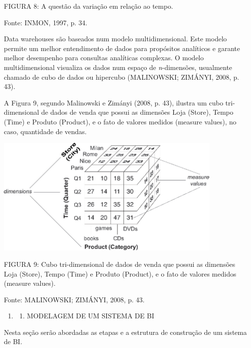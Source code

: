 \documentclass[a4paper]{article}
\newcommand\liststyleWWviiiNumi{%
\renewcommand\theenumi{\arabic{enumi}}
\renewcommand\theenumii{\arabic{enumi}.\arabic{enumii}}
\renewcommand\theenumiii{\arabic{enumi}.\arabic{enumii}.\arabic{enumiii}}
\renewcommand\theenumiv{\arabic{enumi}.\arabic{enumii}.\arabic{enumiii}.\arabic{enumiv}}
\renewcommand\labelenumi{\theenumi}
\renewcommand\labelenumii{\theenumii}
\renewcommand\labelenumiii{\theenumiii}
\renewcommand\labelenumiv{\theenumiv.}
}
\begin{document}
{
\textsf{\MakeUppercase{FIGURA }}\textsf{8: A quest\~ao da varia\c{c}\~ao em rela\c{c}\~ao ao tempo. }}

{
\textsf{Fonte: INMON, 1997, p. 34. \ }}

{
\textsf{Data warehouses s\~ao baseados num modelo multidimensional. Este modelo permite um melhor entendimento de dados
para prop\'ositos anal\'iticos e garante melhor desempenho para consultas anal\'iticas complexas. O modelo
multidimensional visualiza os dados num espa\c{c}o de }\textsf{\textit{n}}\textsf{{}-dimens\~oes, usualmente chamado de
cubo de dados ou hipercubo (MALINOWSKI; ZIM\'ANYI, 2008, p. 43).}}

{
\textsf{A Figura 9, segundo Malinowski e Zim\'anyi (2008, p. 43), ilustra um cubo tri-dimensional de dados de venda que
possui as dimens\~oes Loja (Store), Tempo (Time) e Produto (Product), e o fato de valores medidos (measure values), no
caso, quantidade de vendas.}}


\bigskip

{
 \includegraphics[width=11.18cm,height=5.853cm]{monograph-img009.jpg} \textsf{\MakeUppercase{ }}}

{
\textsf{\MakeUppercase{FIGURA }}\textsf{9: Cubo tri-dimensional de dados de venda que possui as dimens\~oes Loja
(Store), Tempo (Time) e Produto (Product), e o fato de valores medidos (measure values).}}

{
\textsf{Fonte: MALINOWSKI; ZIM\'ANYI, 2008, p. 43.}}


\bigskip

\liststyleWWviiiNumi
\begin{enumerate}
\item \begin{enumerate}
\item {\sffamily
MODELAGEM DE UM SISTEMA DE BI}
\end{enumerate}
\end{enumerate}
{\sffamily
Nesta se\c{c}\~ao ser\~ao abordadas as etapas e a estrutura de constru\c{c}\~ao de um sistema de BI.}
\end{document}
